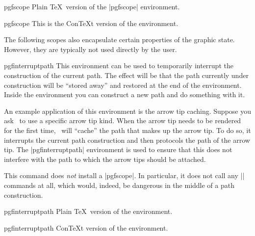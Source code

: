 \begin{plainenvironment}{{pgfscope}}
    Plain \TeX\ version of the |{pgfscope}| environment.
\end{plainenvironment}

\begin{contextenvironment}{{pgfscope}}
    This is the Con\TeX t version of the environment.
\end{contextenvironment}

The following scopes also encapsulate certain properties of the graphic state.
However, they are typically not used directly by the user.

\begin{environment}{{pgfinterruptpath}}
    This environment can be used to temporarily interrupt the construction of
    the current path. The effect will be that the path currently under
    construction will be ``stored away'' and restored at the end of the
    environment. Inside the environment you can construct a new path and do
    something with it.

    An example application of this environment is the arrow tip caching.
    Suppose you ask \pgfname\ to use a specific arrow tip kind. When the arrow
    tip needs to be rendered for the first time, \pgfname\ will ``cache'' the
    path that makes up the arrow tip. To do so, it interrupts the current path
    construction and then protocols the path of the arrow tip. The
    |{pgfinterruptpath}| environment is used to ensure that this does not
    interfere with the path to which the arrow tips should be attached.

    This command does \emph{not} install a |{pgfscope}|. In particular, it does
    not call any |\pgfsys@| commands at all, which would, indeed, be dangerous
    in the middle of a path construction.
\end{environment}

\begin{plainenvironment}{{pgfinterruptpath}}
    Plain \TeX\ version of the environment.
\end{plainenvironment}

\begin{contextenvironment}{{pgfinterruptpath}}
    Con\TeX t version of the environment.
\end{contextenvironment}

